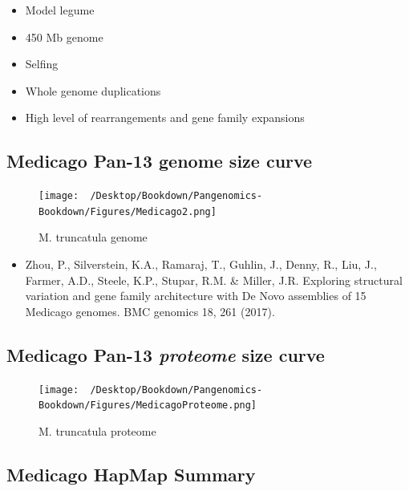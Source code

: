 \documentclass[
]{book}
\providecommand{\tightlist}{%
  \setlength{\itemsep}{0pt}\setlength{\parskip}{0pt}}
\begin{document}
\begin{itemize}
\tightlist
\item
  Model legume
\item
  450 Mb genome
\item
  Selfing
\item
  Whole genome duplications
\item
  High level of rearrangements and gene family expansions
\end{itemize}

\hypertarget{medicago-pan-13-genome-size-curve}{%
\subsection{Medicago Pan-13 genome size curve}\label{medicago-pan-13-genome-size-curve}}

\begin{figure}
\centering
\texttt{[image: ~/Desktop/Bookdown/Pangenomics-Bookdown/Figures/Medicago2.png]}
\caption{M. truncatula genome}
\end{figure}

\begin{itemize}
\tightlist
\item
  Zhou, P., Silverstein, K.A., Ramaraj, T., Guhlin, J., Denny, R., Liu,
  J., Farmer, A.D., Steele, K.P., Stupar, R.M. \& Miller, J.R. Exploring
  structural variation and gene family architecture with De Novo
  assemblies of 15 Medicago genomes. BMC genomics 18, 261 (2017).
\end{itemize}

\hypertarget{medicago-pan-13-proteome-size-curve}{%
\subsection{\texorpdfstring{Medicago Pan-13 \emph{proteome} size curve}{Medicago Pan-13 proteome size curve}}\label{medicago-pan-13-proteome-size-curve}}

\begin{figure}
\centering
\texttt{[image: ~/Desktop/Bookdown/Pangenomics-Bookdown/Figures/MedicagoProteome.png]}
\caption{M. truncatula proteome}
\end{figure}

\hypertarget{medicago-hapmap-summary}{%
\subsection{Medicago HapMap Summary}\label{medicago-hapmap-summary}}
\end{document}
